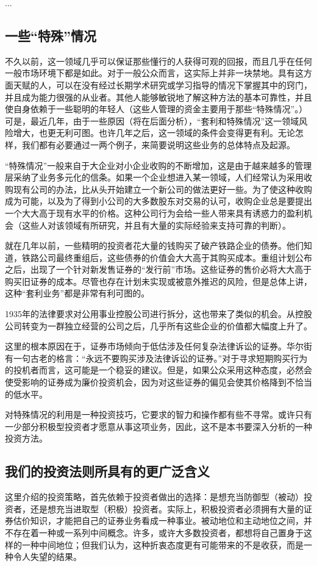 \documentclass[12pt,oneside]{book}
\begin{document}
...

\subsection{一些“特殊”情况}
不久以前，这一领域几乎可以保证那些懂行的人获得可观的回报，而且几乎在任何一般市场环境下都是如此。对于一般公众而言，这实际上并非一块禁地。具有这方面天赋的人，可以在没有经过长期学术研究或学习指导的情况下掌握其中的窍门，并且成为能力很强的从业者。其他人能够敏锐地了解这种方法的基本可靠性，并且使自身依赖于一些聪明的年轻人（这些人管理的资金主要用于那些“特殊情况”。）可是，最近几年，由于一些原因（将在后面分析），“套利和特殊情况”这一领域风险增大，也更无利可图。也许几年之后，这一领域的条件会变得更有利。无论怎样，我们都有必要通过一两个例子，来简要说明这些业务的总体特点及起源。

“特殊情况”一般来自于大企业对小企业收购的不断增加，这是由于越来越多的管理层采纳了业务多元化的信条。如果一个企业想进入某一领域，人们经常认为采用收购现有公司的办法，比从头开始建立一个新公司的做法更好一些。为了使这种收购成为可能，以及为了得到小公司的大多数股东对交易的认可，收购企业总是要提出一个大大高于现有水平的价格。这种公司行为会给一些人带来具有诱惑力的盈利机会（这些人对该领域有所研究，并且有大量的实际经验来支持可靠的判断）。

就在几年以前，一些精明的投资者花大量的钱购买了破产铁路企业的债券。他们知道，铁路公司最终重组后，这些债券的价值会大大高于其购买成本。重组计划公布之后，出现了一个针对新发售证券的“发行前”市场。这些证券的售价必将大大高于购买旧证券的成本。尽管也存在计划未实现或被意外推迟的风险，但是总体上讲，这种“套利业务”都是非常有利可图的。

1935年的法律要求对公用事业控股公司进行拆分，这也带来了类似的机会。从控股公司转变为一群独立经营的公司之后，几乎所有这些企业的价值都大幅度上升了。

这里的根本原因在于，证券市场倾向于低估涉及任何复杂法律诉讼的证券。华尔街有一句古老的格言：“永远不要购买涉及法律诉讼的证券。”对于寻求短期购买行为的投机者而言，这可能是一个稳妥的建议。但是，如果公众采用这种态度，必然会使受影响的证券成为廉价投资机会，因为对这些证券的偏见会使其价格降到不恰当的低水平。

对特殊情况的利用是一种投资技巧，它要求的智力和操作都有些不寻常。或许只有一少部分积极型投资者才愿意从事这项业务，因此，这不是本书要深入分析的一种投资方法。

\subsection{我们的投资法则所具有的更广泛含义}
这里介绍的投资策略，首先依赖于投资者做出的选择：是想充当防御型（被动）投资者，还是想充当进取型（积极）投资者。实际上，积极投资者必须拥有大量的证券估价知识，才能把自己的证券业务看成一种事业。被动地位和主动地位之间，并不存在着一种或一系列中间概念。许多，或许大多数投资者，都想将自己置身于这样的一种中间地位；但我们认为，这种折衷态度更有可能带来的不是收获，而是一种令人失望的结果。
\end{document}
